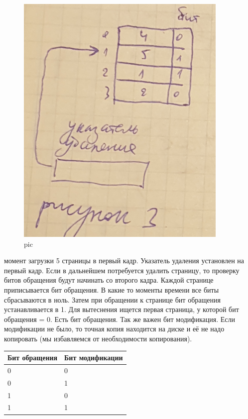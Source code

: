 \begin{figure}[H]
    \centering
    \includegraphics[width=\textwidth]{pic/10.png}
    \caption{pic}
\end{figure}

момент загрузки 5 страницы в первый кадр. Указатель удаления установлен на первый кадр. Если в дальнейшем потребуется удалить страницу, то проверку битов обращения будут начинать со второго кадра.
Каждой странице приписывается бит обращения. В какие то моменты времени все биты сбрасываются в ноль. Затем при обращении к странице бит обращения устанавливается в 1. Для вытеснения ищется первая страница, у которой бит обращения = 0. Есть бит обращения.  Так же важен бит модификация. Если модификации не было, то точная копия находится на диске и её не надо копировать (мы избавляемся от необходимости копирования). 

\begin{table}[H]
\begin{tabular}{|l|l|}
\hline
Бит обращения & Бит модификации\\
\hline
0 & 0 \\
\hline
0 & 1 \\
\hline
1 & 0 \\
\hline
1 & 1\\
\hline
\end{tabular}
\end{table}

